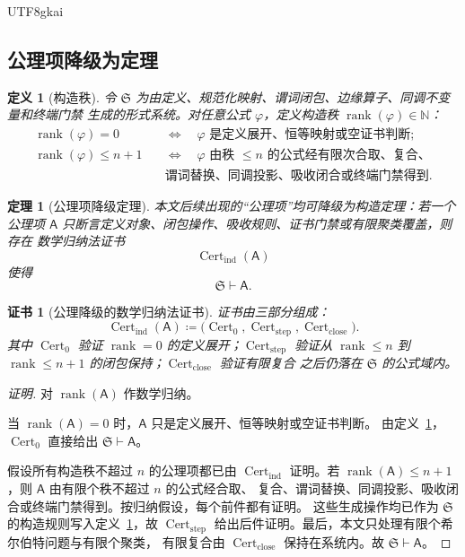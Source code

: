 \documentclass[12pt]{article}
\newtheorem{definition}{定义}[section]
\newtheorem{theorem}{定理}[section]
\newtheorem{Certificate}{证书}[section]
\newcommand{\NN}{\mathbb{N}}
\newcommand{\DefEq}{\coloneqq}
\DeclareMathOperator{\Cert}{Cert}
\DeclareMathOperator{\Rank}{rank}
\begin{document}
\begin{CJK*}{UTF8}{gkai}
\subsection{公理项降级为定理}
\label{subsec:tex59-axiom-downgrade}

\begin{definition}[构造秩]
\label{def:tex59-rank}
令 \(\mathfrak{S}\) 为由定义、规范化映射、谓词闭包、边缘算子、同调不变量和终端门禁
生成的形式系统。对任意公式 \(\varphi\)，定义构造秩 \(\Rank(\varphi)\in\NN\)：
\[
\begin{aligned}
\Rank(\varphi)=0
&\quad\Longleftrightarrow\quad
\varphi \text{ 是定义展开、恒等映射或空证书判断};\\
\Rank(\varphi)\le n+1
&\quad\Longleftrightarrow\quad
\varphi \text{ 由秩 }\le n\text{ 的公式经有限次合取、复合、}\\
&\quad\text{谓词替换、同调投影、吸收闭合或终端门禁得到}.
\end{aligned}
\]
\end{definition}

\begin{theorem}[公理项降级定理]
\label{thm:tex59-axiom-downgrade}
本文后续出现的“公理项”均可降级为构造定理：若一个公理项
\(\mathsf A\) 只断言定义对象、闭包操作、吸收规则、证书门禁或有限聚类覆盖，则存在
数学归纳法证书
\[
  \Cert_{\mathrm{ind}}(\mathsf A)
\]
使得
\[
  \mathfrak{S}\vdash \mathsf A.
\]
\end{theorem}

\begin{Certificate}[公理降级的数学归纳法证书]
\label{cert:tex59-axiom-induction}
证书由三部分组成：
\[
  \Cert_{\mathrm{ind}}(\mathsf A)
  \DefEq
  \bigl(
    \Cert_0,\Cert_{\mathrm{step}},\Cert_{\mathrm{close}}
  \bigr).
\]
其中 \(\Cert_0\) 验证 \(\Rank=0\) 的定义展开；\(\Cert_{\mathrm{step}}\) 验证从
\(\Rank\le n\) 到 \(\Rank\le n+1\) 的闭包保持；\(\Cert_{\mathrm{close}}\) 验证有限复合
之后仍落在 \(\mathfrak{S}\) 的公式域内。
\end{Certificate}

\begin{proof}[证明]
对 \(\Rank(\mathsf A)\) 作数学归纳。

当 \(\Rank(\mathsf A)=0\) 时，\(\mathsf A\) 只是定义展开、恒等映射或空证书判断。
由定义~\ref{def:tex59-rank}，\(\Cert_0\) 直接给出
\(\mathfrak{S}\vdash \mathsf A\)。

假设所有构造秩不超过 \(n\) 的公理项都已由 \(\Cert_{\mathrm{ind}}\) 证明。若
\(\Rank(\mathsf A)\le n+1\)，则 \(\mathsf A\) 由有限个秩不超过 \(n\) 的公式经合取、
复合、谓词替换、同调投影、吸收闭合或终端门禁得到。按归纳假设，每个前件都有证明。
这些生成操作均已作为 \(\mathfrak{S}\) 的构造规则写入定义~\ref{def:tex59-rank}，故
\(\Cert_{\mathrm{step}}\) 给出后件证明。最后，本文只处理有限个希尔伯特问题与有限个聚类，
有限复合由 \(\Cert_{\mathrm{close}}\) 保持在系统内。故
\(\mathfrak{S}\vdash \mathsf A\)。
\end{proof}


\end{CJK*}
\end{document}
